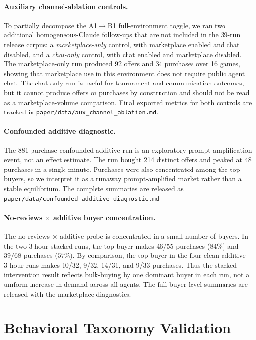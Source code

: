 \documentclass{article}
\begin{document}
\paragraph{Auxiliary channel-ablation controls.}
\label{app:channel-ablation}
To partially decompose the A1$\rightarrow$B1 full-environment toggle, we ran two additional homogeneous-Claude follow-ups that are not included in the 39-run release corpus: a \emph{marketplace-only} control, with marketplace enabled and chat disabled, and a \emph{chat-only} control, with chat enabled and marketplace disabled.
The marketplace-only run produced 92 offers and 34 purchases over 16 games, showing that marketplace use in this environment does not require public agent chat.
The chat-only run is useful for tournament and communication outcomes, but it cannot produce offers or purchases by construction and should not be read as a marketplace-volume comparison.
Final exported metrics for both controls are tracked in \texttt{paper/data/aux\_channel\_ablation.md}.

\paragraph{Confounded additive diagnostic.}
The 881-purchase confounded-additive run is an exploratory prompt-amplification event, not an effect estimate.
The run bought 214 distinct offers and peaked at 48 purchases in a single minute.
Purchases were also concentrated among the top buyers, so we interpret it as a runaway prompt-amplified market rather than a stable equilibrium.
The complete summaries are released as \texttt{paper/data/confounded\_additive\_diagnostic.md}.

\paragraph{No-reviews $\times$ additive buyer concentration.}
The no-reviews $\times$ additive probe is concentrated in a small number of buyers.
In the two 3-hour stacked runs, the top buyer makes 46/55 purchases ($84\%$) and 39/68 purchases ($57\%$).
By comparison, the top buyer in the four clean-additive 3-hour runs makes 10/32, 9/32, 14/31, and 9/33 purchases.
Thus the stacked-intervention result reflects bulk-buying by one dominant buyer in each run, not a uniform increase in demand across all agents.
The full buyer-level summaries are released with the marketplace diagnostics.

\section{Behavioral Taxonomy Validation}
\label{app:taxonomy-calibration}
\end{document}

